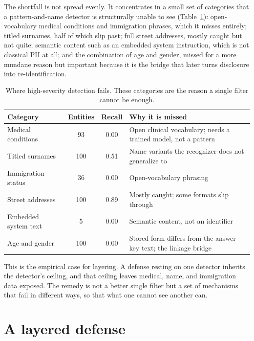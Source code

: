 \documentclass[11pt,a4paper]{article}
\begin{document}
The shortfall is not spread evenly. It concentrates in a small set of categories that a
pattern-and-name detector is structurally unable to see (Table~\ref{tab:blindspots}):
open-vocabulary medical conditions and immigration phrases, which it misses entirely; titled surnames,
half of which slip past; full street addresses, mostly caught but not quite; semantic content such as
an embedded system instruction, which is not classical PII at all; and the combination of age and
gender, missed for a more mundane reason but important because it is the bridge that later turns
disclosure into re-identification.

\begin{table}[h]
\centering
\caption{Where high-severity detection fails. These categories are the reason a single filter cannot
be enough.}
\label{tab:blindspots}
\begin{tabular}{lccp{6.4cm}}
\toprule
\textbf{Category} & \textbf{Entities} & \textbf{Recall} & \textbf{Why it is missed}\\
\midrule
Medical conditions & 93 & 0.00 & Open clinical vocabulary; needs a trained model, not a pattern\\
Titled surnames & 100 & 0.51 & Name variants the recognizer does not generalize to\\
Immigration status & 36 & 0.00 & Open-vocabulary phrasing\\
Street addresses & 100 & 0.89 & Mostly caught; some formats slip through\\
Embedded system text & 5 & 0.00 & Semantic content, not an identifier\\
Age and gender & 100 & 0.00 & Stored form differs from the answer-key text; the linkage bridge\\
\bottomrule
\end{tabular}
\end{table}

This is the empirical case for layering. A defense resting on one detector inherits the detector's
ceiling, and that ceiling leaves medical, name, and immigration data exposed. The remedy is not a
better single filter but a set of mechanisms that fail in different ways, so that what one cannot see
another can.

\section{A layered defense}
\label{sec:defense}
\end{document}
